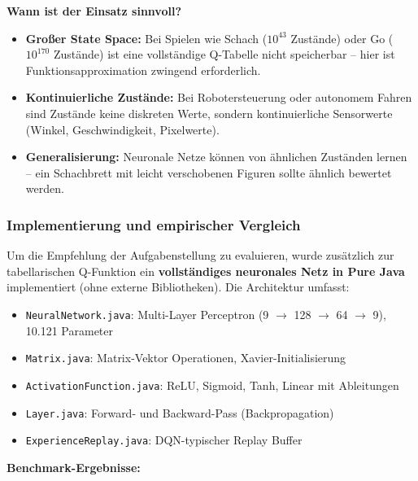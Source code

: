 \textbf{Wann ist der Einsatz sinnvoll?}
\begin{itemize}
    \item \textbf{Großer State Space:} Bei Spielen wie Schach ($10^{43}$ Zustände) oder Go ($10^{170}$ Zustände) ist eine vollständige Q-Tabelle nicht speicherbar -- hier ist Funktionsapproximation zwingend erforderlich.
    \item \textbf{Kontinuierliche Zustände:} Bei Robotersteuerung oder autonomem Fahren sind Zustände keine diskreten Werte, sondern kontinuierliche Sensorwerte (Winkel, Geschwindigkeit, Pixelwerte).
    \item \textbf{Generalisierung:} Neuronale Netze können von ähnlichen Zuständen lernen -- ein Schachbrett mit leicht verschobenen Figuren sollte ähnlich bewertet werden.
\end{itemize}

\subsubsection{Implementierung und empirischer Vergleich}

Um die Empfehlung der Aufgabenstellung zu evaluieren, wurde zusätzlich zur tabellarischen Q-Funktion ein \textbf{vollständiges neuronales Netz in Pure Java} implementiert (ohne externe Bibliotheken). Die Architektur umfasst:

\begin{itemize}
    \item \texttt{NeuralNetwork.java}: Multi-Layer Perceptron (9 $\rightarrow$ 128 $\rightarrow$ 64 $\rightarrow$ 9), 10.121 Parameter
    \item \texttt{Matrix.java}: Matrix-Vektor Operationen, Xavier-Initialisierung
    \item \texttt{ActivationFunction.java}: ReLU, Sigmoid, Tanh, Linear mit Ableitungen
    \item \texttt{Layer.java}: Forward- und Backward-Pass (Backpropagation)
    \item \texttt{ExperienceReplay.java}: \ac{DQN}-typischer Replay Buffer
\end{itemize}

\textbf{Benchmark-Ergebnisse:}


